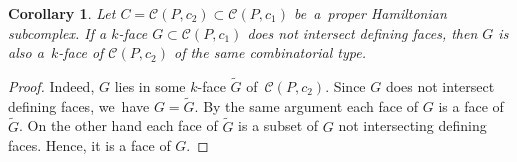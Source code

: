 \documentclass[12pt]{amsart}
\newtheorem{corollary}[formula]{Corollary}
\theoremstyle{definition}
\theoremstyle{remark}
\begin{document}
\begin{corollary}\label{cor:GneMq}
Let $C=\mathcal{C}(P,c_2)\subset\mathcal{C}(P,c_1)$ be~a~proper Hamiltonian subcomplex.
If a $k$-face $G\subset \mathcal{C}(P,c_1)$ does not intersect defining faces, then
$G$ is also a~$k$-face of $\mathcal{C}(P,c_2)$ of the same combinatorial type. 
\end{corollary}
\begin{proof}
Indeed, $G$ lies in some $k$-face $\widetilde{G}$ of~$\mathcal{C}(P,c_2)$. 
Since $G$ does not intersect defining faces, we~have $G=\widetilde{G}$.
By the same argument each face of $G$ is a face of $\widetilde{G}$. On the other hand
each face of $\widetilde{G}$ is a subset of $G$ not intersecting defining faces. Hence, it
is a face of $G$. 
\end{proof}
\end{document}
